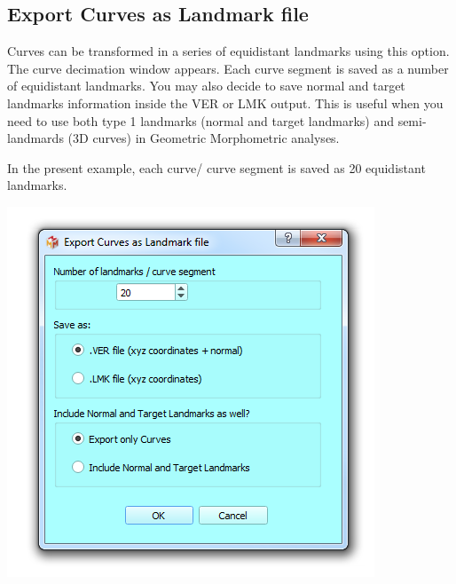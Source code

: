 \subsection{Export Curves as Landmark file}
\begin{minipage}{0.55\textwidth}

Curves can be transformed in a series of equidistant
landmarks using this option. The curve decimation window
appears.
Each curve segment is saved as a number of
equidistant landmarks. You may also decide to save normal and target landmarks information inside the VER or LMK output. This is useful when you need to use both type 1 landmarks (normal and target landmarks) and semi-landmards (3D curves) in Geometric Morphometric analyses. 

In the present example, each curve/
curve segment is saved as 20 equidistant landmarks.

\end{minipage}  
 \begin{minipage}{0.45\textwidth}\centering
  \includegraphics[scale=0.5]{images/07/curves/export.png}
 \end{minipage} 



